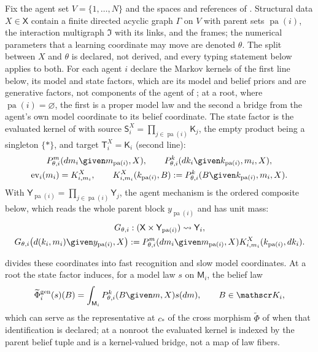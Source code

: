 Fix the agent set $V=\{1,\ldots,N\}$ and the spaces and references of . Structural
data $X\in\mathsf X$ contain a finite directed acyclic graph $\Gamma$ on $V$ with parent sets
$\operatorname{pa}(i)$, the interaction multigraph $\mathfrak I$ with its links, and the frames; the
numerical parameters that a learning coordinate may move are denoted $\theta$. The split between $X$
and $\theta$ is declared, not derived, and every typing statement below applies to both. For each agent
$i$ declare the Markov kernels of the first line below, its model and state factors, which are its model
and belief priors and are generative factors, not components of the agent of ; at a
root, where $\operatorname{pa}(i)=\varnothing$, the first is a proper model law and the second a bridge
from the agent's own model coordinate to its belief coordinate. The state factor is the evaluated
kernel of  with source
$\mathsf S_i^X=\prod_{j\in\operatorname{pa}(i)}\mathsf K_j$, the empty product being a singleton
$\{\ast\}$, and target $\mathsf T_i^X=\mathsf K_i$ (second line):
\begin{gather}
P_{\theta,i}^{m}(dm_i\given m_{\operatorname{pa}(i)},X),
\qquad
P_{\theta,i}^{k}(dk_i\given k_{\operatorname{pa}(i)},m_i,X),
\label{eq:gen-kernels}\\
\operatorname{ev}_i(m_i)=K^X_{i,m_i},
\qquad
K^X_{i,m_i}(k_{\operatorname{pa}(i)},B):=P_{\theta,i}^{k}(B\given k_{\operatorname{pa}(i)},m_i,X).
\label{eq:gen-evaluated-state-kernel}
\end{gather}
With $\mathsf Y_{\operatorname{pa}(i)}=\prod_{j\in\operatorname{pa}(i)}\mathsf Y_j$, the agent mechanism is the
ordered composite below, which reads the whole parent block $y_{\operatorname{pa}(i)}$ and has unit mass:
\begin{gather}
G_{\theta,i}:(\mathsf X\times\mathsf Y_{\operatorname{pa}(i)})\rightsquigarrow\mathsf Y_i,
\label{eq:gen-agent-design-mechanism}\\
G_{\theta,i}\bigl(d(k_i,m_i)\given y_{\operatorname{pa}(i)},X\bigr)
:=P_{\theta,i}^{m}(dm_i\given m_{\operatorname{pa}(i)},X)K^X_{i,m_i}(k_{\operatorname{pa}(i)},dk_i).
\label{eq:gen-agent-mechanism}
\end{gather}

 divides these coordinates into fast recognition and slow model
coordinates. At a root the state factor induces, for a model law $s$ on
$\mathsf M_i$, the belief law
\begin{equation}
\widetilde\Phi^{\mathrm{gen}}_i(s)(B)=\int_{\mathsf M_i}P_{\theta,i}^{k}(B\given m,X)s(dm),
\qquad B\in\mathscr K_i,
\label{eq:gen-root-law-bridge}
\end{equation}
which can serve as the representative at $c_*$ of the cross morphism $\widetilde\Phi$ of
 when that identification is declared; at a nonroot the evaluated kernel
is indexed by the parent belief tuple and is a kernel-valued bridge, not a map of law fibers.

